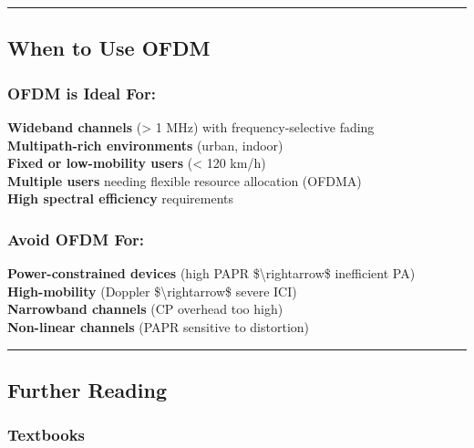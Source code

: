 \begin{center}\rule{0.5\linewidth}{0.5pt}\end{center}

\subsection{\texorpdfstring{ When to Use
OFDM}{ When to Use OFDM}}\label{when-to-use-ofdm}

\subsubsection{OFDM is Ideal For:}\label{ofdm-is-ideal-for}

\textbf{Wideband channels} (\textgreater{} 1 MHz) with
frequency-selective fading\\
\textbf{Multipath-rich environments} (urban, indoor)\\
\textbf{Fixed or low-mobility users} (\textless{} 120 km/h)\\
\textbf{Multiple users} needing flexible resource allocation (OFDMA)\\
\textbf{High spectral efficiency} requirements

\subsubsection{Avoid OFDM For:}\label{avoid-ofdm-for}

\textbf{Power-constrained devices} (high PAPR
\$\textbackslash rightarrow\$ inefficient PA)\\
\textbf{High-mobility} (Doppler \$\textbackslash rightarrow\$ severe
ICI)\\
\textbf{Narrowband channels} (CP overhead too high)\\
\textbf{Non-linear channels} (PAPR sensitive to distortion)

\begin{center}\rule{0.5\linewidth}{0.5pt}\end{center}

\subsection{\texorpdfstring{ Further
Reading}{ Further Reading}}\label{further-reading}

\subsubsection{Textbooks}\label{textbooks}

